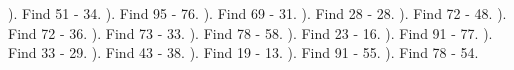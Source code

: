 \documentclass{article}%
\begin{document}
). Find 51 {-} 34.%
\newline%
\newline%
). Find 95 {-} 76.%
\newline%
\newline%
). Find 69 {-} 31.%
\newline%
\newline%
). Find 28 {-} 28.%
\newline%
\newline%
). Find 72 {-} 48.%
\newline%
\newline%
). Find 72 {-} 36.%
\newline%
\newline%
). Find 73 {-} 33.%
\newline%
\newline%
). Find 78 {-} 58.%
\newline%
\newline%
). Find 23 {-} 16.%
\newline%
\newline%
). Find 91 {-} 77.%
\newline%
\newline%
). Find 33 {-} 29.%
\newline%
\newline%
). Find 43 {-} 38.%
\newline%
\newline%
). Find 19 {-} 13.%
\newline%
\newline%
). Find 91 {-} 55.%
\newline%
\newline%
). Find 78 {-} 54.%
\newline%
\newline%
\newline%
\end{document}
